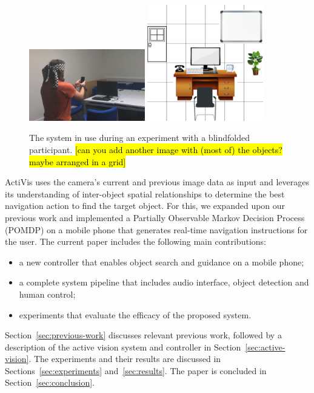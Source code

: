 \documentclass[runningheads]{llncs}
\DeclareRobustCommand{\tofix}[1]{{\sethlcolor{yellow}\hl{[#1]}}}
\begin{document}
\begin{figure}
  \centering
  \includegraphics[width=0.45\textwidth]{figures/system_use.png} \hfil
  \includegraphics[width=0.45\textwidth]{figures/object_grid/grid.png}
  \caption{The system in use during an experiment with a blindfolded participant. \tofix{can you add another image with (most of) the objects? maybe arranged in a grid} }\label{fig:system-in-use}
\end{figure}

ActiVis uses the camera's current and previous image data as input and leverages its understanding of inter-object spatial relationships to determine the best navigation action to find the target object.
For this, we expanded upon our previous work and implemented a Partially Observable Markov Decision Process (POMDP) on a mobile phone that generates real-time navigation instructions for the user.
The current paper includes the following main contributions:

\begin{itemize}
  \item a new controller that enables object search and guidance on a mobile phone;
  \item a complete system pipeline that includes audio interface, object detection and human control;
  \item experiments that evaluate the efficacy of the proposed system.
\end{itemize}

Section~\ref{sec:previous-work} discusses relevant previous work, followed by a description of the active vision system and controller in Section~\ref{sec:active-vision}.
The experiments and their results are discussed in Sections~\ref{sec:experiments} and~\ref{sec:results}.
The paper is concluded in Section~\ref{sec:conclusion}.
\end{document}
